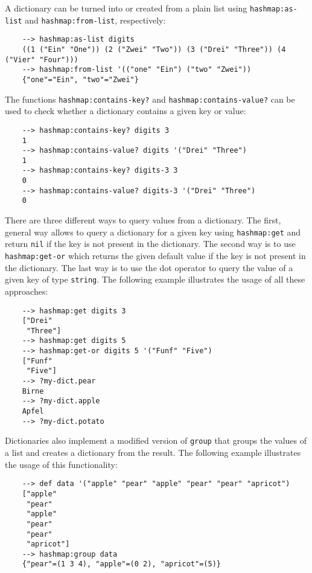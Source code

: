 A dictionary can be turned into or created from a plain list using \verb|hashmap:as-list| and \verb|hashmap:from-list|, respectively:

\begin{Verbatim}
    --> hashmap:as-list digits
    ((1 ("Ein" "One")) (2 ("Zwei" "Two")) (3 ("Drei" "Three")) (4 ("Vier" "Four")))
    --> hashmap:from-list '(("one" "Ein") ("two" "Zwei"))
    {"one"="Ein", "two"="Zwei"}
\end{Verbatim}

The functions \verb|hashmap:contains-key?| and \verb|hashmap:contains-value?| can be used to check whether a dictionary contains a given key or value:

\begin{Verbatim}
    --> hashmap:contains-key? digits 3
    1
    --> hashmap:contains-value? digits '("Drei" "Three")
    1
    --> hashmap:contains-key? digits-3 3
    0
    --> hashmap:contains-value? digits-3 '("Drei" "Three")
    0
\end{Verbatim}

There are three different ways to query values from a dictionary. The first, general way allows to query a dictionary for a given key using \verb|hashmap:get| and return \verb|nil| if the key is not present in the dictionary. The second way is to use \verb|hashmap:get-or| which returns the given default value if the key is not present in the dictionary. The last way is to use the dot operator to query the value of a given key of type \verb|string|. The following example illustrates the usage of all these approaches:

\begin{Verbatim}
    --> hashmap:get digits 3
    ["Drei"
     "Three"]
    --> hashmap:get digits 5
    --> hashmap:get-or digits 5 '("Funf" "Five")
    ["Funf"
     "Five"]
    --> ?my-dict.pear
    Birne
    --> ?my-dict.apple
    Apfel
    --> ?my-dict.potato
\end{Verbatim}

Dictionaries also implement a modified version of \verb|group| that groups the values of a list and creates a dictionary from the result. The following example illustrates the usage of this functionality:

\begin{Verbatim}
    --> def data '("apple" "pear" "apple" "pear" "pear" "apricot")
    ["apple"
     "pear"
     "apple"
     "pear"
     "pear"
     "apricot"]
    --> hashmap:group data
    {"pear"=(1 3 4), "apple"=(0 2), "apricot"=(5)}
\end{Verbatim}

